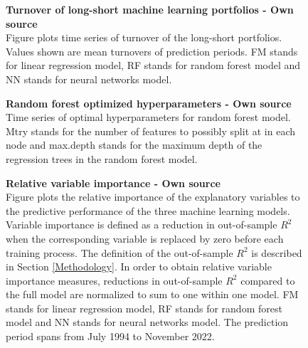 \documentclass[12pt]{article}
\begin{document}
\begin{appendices}
\begin{figure}[H]
\centering
\caption[Turnover of long-short machine learning portfolios]{\textbf{Turnover of long-short machine learning portfolios \textnormal{- Own source}}\\ Figure plots time series of turnover of the long-short portfolios. Values shown are mean turnovers of prediction periods. FM stands for linear regression model, RF stands for random forest model and NN stands for neural networks model. }

\label{plot:Turnover}
\end{figure}

\begin{figure}[H]
\centering
\caption[Optimized random forest hyperparameters]{\textbf{Random forest optimized hyperparameters \textnormal{- Own source}}\\ Time series of optimal hyperparameters for random forest model. Mtry stands for the number of features to possibly split at in each node and max.depth stands for the maximum depth of the regression trees in the random forest model.}

\label{plot:RFHyperParams}
\end{figure}
\end{appendices}

\begin{figure}[p]
\centering
\caption[Relative variable importance]{\textbf{Relative variable importance \textnormal{- Own source}}\\ Figure plots the relative importance of the explanatory variables to the predictive performance of the three machine learning models. Variable importance is defined as a reduction in out-of-sample $R^2$ when the corresponding variable is replaced by zero before each training process. The definition of the out-of-sample $R^2$ is described in Section \ref{Methodology}. In order to obtain relative variable importance measures, reductions in out-of-sample $R^2$ compared to the full model are normalized to sum to one within one model. FM stands for linear regression model, RF stands for random forest model and NN stands for neural networks model. The prediction period spans from July 1994 to November 2022.}

\label{plot:relative_VI}
\end{figure}

\clearpage




\clearpage
\end{document}
